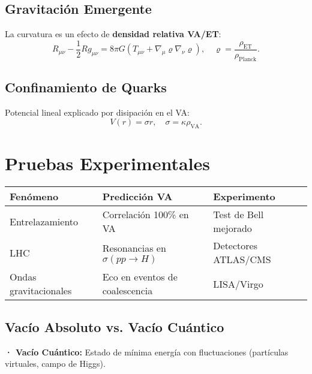 \documentclass[a4paper]{article}
\theoremstyle{definition}
\theoremstyle{remark}
\numberwithin{equation}{section}
\begin{document}
	\subsection{Gravitación Emergente}
	La curvatura es un efecto de \textbf{densidad relativa VA/ET}:
	\[
	R_{\mu\nu} - \frac{1}{2}R g_{\mu\nu} = 8\pi G \left( T_{\mu\nu} + \nabla_\mu \varrho \nabla_\nu \varrho \right), \quad \varrho = \frac{\rho_{\text{ET}}}{\rho_{\text{Planck}}}.
	\]
	
	\subsection{Confinamiento de Quarks}
	
	Potencial lineal explicado por disipación en el VA:\\
	
	\[
	V(r) = \sigma r, \quad \sigma = \kappa \rho_{\text{VA}}.
	\]
	
	\section{Pruebas Experimentales}
	\label{sec:pruebas}
	\renewcommand{\arraystretch}{1.3} %
	
	\begin{table}[h]
		\centering
		\begin{tabular}{
				>{\raggedright\arraybackslash}p{3.5cm} 
				>{\raggedright\arraybackslash}p{5cm} 
				>{\raggedright\arraybackslash}p{4.5cm}
			}
			\toprule
			\textbf{Fenómeno} & \textbf{Predicción VA} & \textbf{Experimento} \\
			\midrule
			Entrelazamiento & Correlación 100\% en VA & Test de Bell mejorado \\
			LHC & Resonancias en $\sigma(pp \to H)$ & Detectores ATLAS/CMS \\
			Ondas gravitacionales & Eco en eventos de coalescencia & LISA/Virgo \\
			\bottomrule
		\end{tabular}
	\end{table}
	
	
	
	\subsection{Vacío Absoluto vs. Vacío Cuántico}
	
	\textbf{· Vacío Cuántico:} Estado de mínima energía con fluctuaciones \cite{Rovelli2004} (partículas virtuales, campo de Higgs).\\
	
\end{document}

